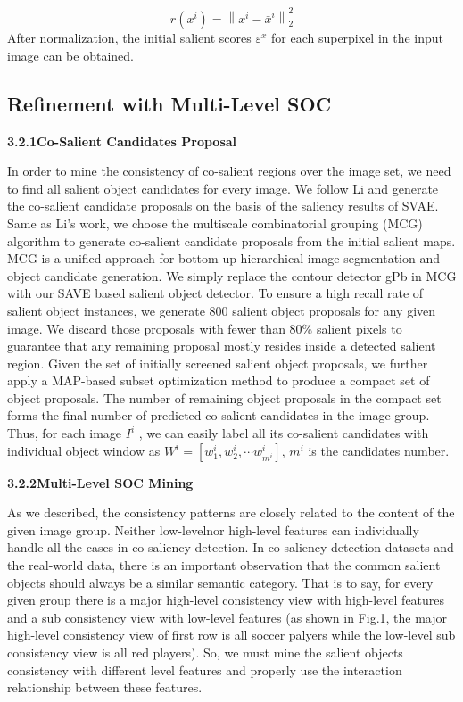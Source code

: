 \documentclass[sigconf]{acmart}
\begin{document}
\begin{equation}
r(x^{i}) = \left \| x^{i}-\bar{x}^{i} \right \|_{2}^{2}
\end{equation}
After normalization, the initial salient scores $\varepsilon^{x}$ for each superpixel in the input image can be obtained. 

\subsection{Refinement with Multi-Level SOC}
\vspace{3pt}
\textbf{3.2.1\quad Co-Salient Candidates Proposal}
\vspace{3pt}

In order to mine the consistency of co-salient regions over the image set, we need to find all salient object candidates for every image. We follow Li \cite{DBLP:conf/cvpr/LiXLY17} and generate the co-salient candidate proposals on the basis of the saliency results of SVAE. Same as Li's work, we choose the multiscale combinatorial grouping (MCG) algorithm \cite{DBLP:conf/cvpr/ArbelaezPBMM14} to generate co-salient candidate proposals from the initial salient maps. MCG is a unified approach for bottom-up hierarchical image segmentation and object candidate generation. We simply replace the contour detector gPb in MCG with our SAVE based salient object detector. To ensure a high recall rate of salient object instances, we generate 800 salient object proposals for any given image. We discard those proposals with fewer than $80\%$ salient pixels to guarantee that any remaining proposal mostly resides inside a detected salient region. Given the set of initially screened salient object proposals, we further apply a MAP-based subset optimization method \cite{DBLP:conf/cvpr/ZhangS0SPM16} to produce a compact set of object proposals. The number of remaining object proposals in the compact set forms the final number of predicted co-salient candidates in the image group. Thus, for each image $I^{i}$ , we can easily label all its co-salient candidates with individual object window as $ W^{i}=[w_{1}^{i}, w_{2}^{i},\cdots w_{m^{i}}^{i} ]$,  $m^{i}$ is the  candidates number.

\vspace{3pt}
\noindent \textbf{3.2.2\quad Multi-Level SOC Mining}
\vspace{3pt}

\noindent As we described, the consistency patterns are closely related to the content of the given image group. Neither low-levelnor high-level features can individually handle all the cases in co-saliency detection. In co-saliency detection datasets and the real-world data, there is an important observation that the common salient objects should always be a similar semantic category. That is to say, for every given group there is a major high-level consistency view with high-level features and a sub consistency view with low-level features (as shown in Fig.1, the major high-level consistency view of first row is all soccer palyers while the low-level sub consistency view is all red players).  So, we must mine the salient objects consistency with different level features and properly use the interaction relationship between these features.
\end{document}
